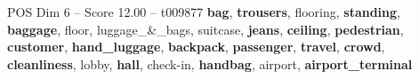 \begin{textsample}{POS Dim 6 – Score 12.00 – t009877}  \label{ex:f6_pos_025}
\textbf{bag}, \textbf{trousers}, flooring, \textbf{standing}, \textbf{baggage}, floor, luggage\_\&\_bags, suitcase, \textbf{jeans}, \textbf{ceiling}, \textbf{pedestrian}, \textbf{customer}, \textbf{hand\_luggage}, \textbf{backpack}, \textbf{passenger}, \textbf{travel}, \textbf{crowd}, \textbf{cleanliness}, lobby, \textbf{hall}, check-in, \textbf{handbag}, airport, \textbf{airport\_terminal}

\end{textsample}
